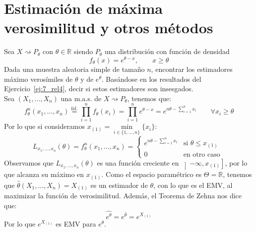\section{Estimación de máxima verosimilitud y otros métodos}
\begin{ejercicio}
    Sea $X\rightsquigarrow P_\theta$ con $\theta\in \mathbb{R}$ siendo $P_\theta$ una distribución con función de densidad
    \begin{equation*}
        f_\theta(x) = e^{\theta-x}, \qquad x\geq \theta
    \end{equation*}
    Dada una muestra aleatoria simple de tamaño $n$, encontrar los estimadores máximo verosímiles de $\theta$ y de $e^\theta$. Basándose en los resultados del Ejercicio~\ref{ej:7_rel4}, decir si estos estimadores son insesgados.\\

    \noindent
    Sea $(X_1, \ldots, X_n)$ una m.a.s. de $X\rightsquigarrow  P_\theta$, tenemos que:
    \begin{equation*}
        f^n_\theta(x_1, \ldots, x_n) \stackrel{\text{iid.}}{=} \prod_{i=1}^{n}f_\theta(x_i) = \prod_{i=1}^{n} e^{\theta-x} = e^{n\theta - \sum\limits_{i=1}^n x_i} \qquad \forall x_i \geq \theta
    \end{equation*}
    Por lo que si consideramos $x_{(1)} = \min\limits_{i \in \{1,\ldots,n\}}\{x_i\}$:
    \begin{equation*}
        L_{x_1,\ldots, x_n}(\theta) = f^n_\theta(x_1,\ldots,x_n) = \left\{\begin{array}{ll}
                e^{n\theta - \sum\limits_{i=1}^n x_i}  & \text{si\ } \theta \leq x_{(1)}  \\
             0 & \text{en otro caso\ } 
        \end{array}\right. 
    \end{equation*}
    Observamos que $L_{x_1,\ldots,x_n}(\theta)$ es una función creciente en $\left]-\infty,x_{(1)}\right]$, por lo que alcanza su máximo en $x_{(1)}$. Como el espacio paramétrico es $\Theta = \mathbb{R}$, tenemos que $\widehat{\theta}(X_1, \ldots, X_n) = X_{(1)}$ es un estimador de $\theta$, con lo que es el EMV, al maximizar la función de verosimilitud. Además, el Teorema de Zehna nos dice que:
    \begin{equation*}
        \widehat{e^\theta} = e^{\widehat{\theta}} = e^{X_{(1)}}
    \end{equation*}
    Por lo que $e^{X_{(1)}}$ es EMV para $e^{\theta}$.\\ 


\end{ejercicio}
